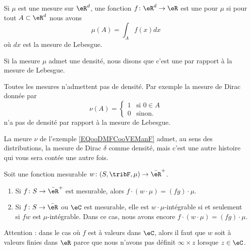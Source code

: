 \begin{definition}
	Si \( \mu\) est une mesure sur \( \eR^d\), une fonction \( f\colon \eR^d\to \eR\) est une  pour \( \mu\) si pour tout \( A\subset\eR^d\) nous avons
	\begin{equation}
		\mu(A)=\int_Af(x)dx
	\end{equation}
	où \( dx\) est la mesure de Lebesgue.

	Si la mesure \( \mu\) admet une densité, nous disons que c'est une  par rapport à la mesure de Lebesgue.
\end{definition}

\begin{example}
	Toutes les mesures n'admettent pas de densité. Par exemple la mesure de Dirac donnée par
	\begin{equation}        \label{EQooDMFCooVEManF}
		\nu(A)=\begin{cases}
			1 & \text{si } 0\in A \\
			0 & \text{sinon. }
		\end{cases}
	\end{equation}
	n'a pas de densité par rapport à la mesure de Lebesgue.
\end{example}

La meure \( \nu\) de l'exemple \ref{EQooDMFCooVEManF} admet, au sens des distributions, la mesure de Dirac \( \delta\) comme densité, mais c'est une autre histoire qui vous sera contée une autre fois.

\begin{proposition}  \label{PropooJMWAooDzfpmB}
	Soit une fonction mesurable \( w\colon (S,\tribF,\mu)\to \bar \eR^+\).
	\begin{enumerate}
		\item
		      Si \( f\colon S\to \bar\eR^+\) est mesurable, alors \( f\cdot(w\cdot \mu)=(fg)\cdot \mu\).
		\item
		      Si \( f\colon S\to \bar \eR\) ou \( \eC\) est mesurable, elle est \( w\cdot\mu\)-intégrable si et seulement si \( fw\) est \( \mu\)-intégrable. Dans ce cas, nous avons encore \( f\cdot(w\cdot \mu)=(fg)\cdot\mu\).
	\end{enumerate}
	Attention : dans le cas où \( f\) est à valeurs dans \( \eC\), alors il faut que \( w\) soit à valeurs finies dans \( \eR\) parce que nous n'avons pas définit \( \infty\times z\) lorsque \( z\in \eC\).
\end{proposition}


